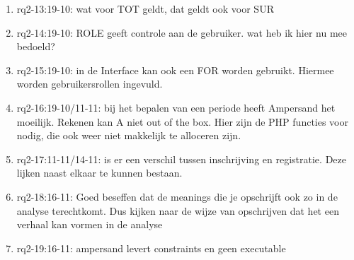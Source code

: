 \begin{enumerate}
    \item rq2-13:19-10: wat voor TOT geldt, dat geldt ook voor SUR
    \item rq2-14:19-10: ROLE geeft controle aan de gebruiker. wat heb ik hier nu mee bedoeld?
    \item rq2-15:19-10: in de Interface kan ook een FOR worden gebruikt. Hiermee worden gebruikersrollen ingevuld.
    \item rq2-16:19-10/11-11: bij het bepalen van een periode heeft Ampersand het moeilijk. Rekenen kan A niet out of the box. Hier zijn de PHP functies voor nodig, die ook weer niet makkelijk te alloceren zijn.
    \item rq2-17:11-11/14-11: is er een verschil tussen inschrijving en registratie. Deze lijken naast elkaar te kunnen bestaan.
    \item rq2-18:16-11: Goed beseffen dat de meanings die je opschrijft ook zo in de analyse terechtkomt. Dus kijken naar de wijze van opschrijven dat het een verhaal kan vormen in de analyse
    \item rq2-19:16-11: ampersand levert constraints en geen executable
\end{enumerate}
